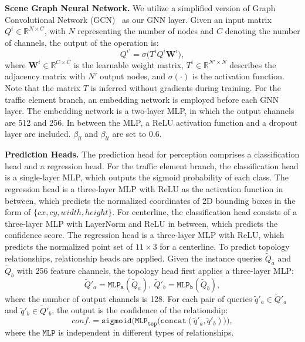 \smallskip
\noindent
\textbf{Scene Graph Neural Network.}
We utilize a simplified version of Graph Convolutional Network (GCN)~\cite{kipf2016semi} as our GNN layer. 
Given an input matrix $Q^{i} \in \mathbb{R}^{N \times C}$, with $N$ representing the number of nodes and $C$ denoting the number of channels, the output of the operation is:
\begin{equation}
    Q^{i'} = \sigma \Big( T^i Q^{i} \mathbf{W}^{i} \Big),
\end{equation}
where $\mathbf{W}^i \in \mathbb{R}^{C \times C}$ is the learnable weight matrix, $T^i \in \mathbb{R}^{N' \times N}$ describes the adjacency matrix with $N'$ output nodes, and $\sigma(\cdot)$ is the activation function. 
Note that the matrix $T$ is inferred without gradients during training.
For the traffic element branch, an embedding network is employed before each GNN layer. The embedding network is a two-layer MLP, in which the output channels are 512 and 256.
In between the MLP, a ReLU activation function and a dropout layer are included. $\beta_{ll}$ and $\beta_{lt}$ are set to 0.6.

\smallskip
\noindent
\textbf{Prediction Heads.}
The prediction head for perception comprises a classification head and a regression head.
For the traffic element branch, the classification head is a single-layer MLP, which outputs the sigmoid probability of each class. 
The regression head is a three-layer MLP with ReLU as the activation function in between, which predicts the normalized coordinates of 2D bounding boxes in the form of $\{cx, cy, width, height\}$.
For centerline, the classification head consists of a three-layer MLP with LayerNorm and ReLU in between, which predicts the confidence score. 
The regression head is a three-layer MLP with ReLU, which predicts the normalized point set of $11 \times 3$ for a centerline.
To predict topology relationships, relationship heads are applied.
Given the instance queries $\widetilde{Q}_{a}$ and $\widetilde{Q}_{b}$ with 256 feature channels, the topology head first applies a three-layer MLP:
\begin{equation}
    {\widetilde{Q}'_{a}} = \texttt{MLP}_{\texttt{a}} (\widetilde{Q}_{a}), \ {\widetilde{Q}'_{b}} = \texttt{MLP}_{\texttt{b}} (\widetilde{Q}_{b}),
\end{equation}
where the number of output channels is 128.
For each pair of queries $\tilde{q}'_{a} \in \widetilde{Q}'_a$ and $\tilde{q}'_{b} \in \widetilde{Q}'_b$, the output is the confidence of the relationship:
\begin{equation}
    conf. = \texttt{sigmoid} \Big( \texttt{MLP}_{\texttt{top}} \big( \texttt{concat}(\tilde{q}'_{a}, \tilde{q}'_{b}) \big) \Big),
\end{equation}
where the $\texttt{MLP}$ is independent in different types of relationships.

